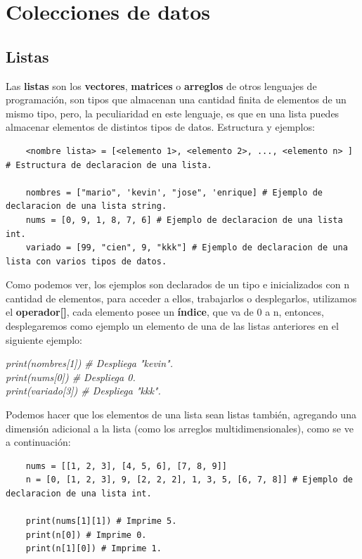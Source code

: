 \section{Colecciones de datos}


\subsection{Listas}
\hspace{0.55cm}Las \textbf{listas} son los \textbf{vectores}, \textbf{matrices} o \textbf{arreglos} de otros lenguajes de programación, son tipos que almacenan una cantidad finita de elementos de un mismo tipo, pero, la peculiaridad en este lenguaje, es que en una lista puedes almacenar elementos de distintos tipos de datos. Estructura y ejemplos:
\begin{lstlisting}
	<nombre lista> = [<elemento 1>, <elemento 2>, ..., <elemento n> ] # Estructura de declaracion de una lista.

	nombres = ["mario", 'kevin', "jose", 'enrique] # Ejemplo de declaracion de una lista string.
	nums = [0, 9, 1, 8, 7, 6] # Ejemplo de declaracion de una lista int.
	variado = [99, "cien", 9, "kkk"] # Ejemplo de declaracion de una lista con varios tipos de datos.
\end{lstlisting}

Como podemos ver, los ejemplos son declarados de un tipo e inicializados con n cantidad de elementos, para acceder a ellos, trabajarlos o desplegarlos, utilizamos el \textbf{operador[]}, cada elemento posee un \textbf{índice}, que va de 0 a n, entonces, desplegaremos como ejemplo un elemento de una de las listas anteriores en el siguiente ejemplo:
\begin{center}
	\textit{
		print(nombres[1]) \# Despliega "kevin". \\
		print(nums[0]) \# Despliega 0. \\
		print(variado[3]) \# Despliega "kkk".
	}
\end{center}

Podemos hacer que los elementos de una lista sean listas también, agregando una dimensión adicional a la lista (como los arreglos multidimensionales), como se ve a continuación:
\begin{lstlisting}
	nums = [[1, 2, 3], [4, 5, 6], [7, 8, 9]]
	n = [0, [1, 2, 3], 9, [2, 2, 2], 1, 3, 5, [6, 7, 8]] # Ejemplo de declaracion de una lista int.
	
	print(nums[1][1]) # Imprime 5.
	print(n[0]) # Imprime 0.
	print(n[1][0]) # Imprime 1.
\end{lstlisting}

